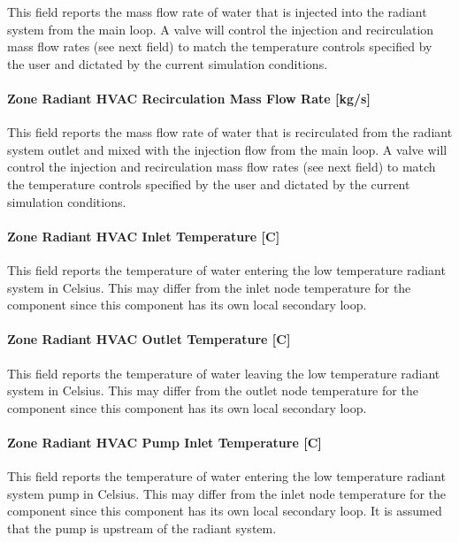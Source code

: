 This field reports the mass flow rate of water that is injected into the radiant system from the main loop. A valve will control the injection and recirculation mass flow rates (see next field) to match the temperature controls specified by the user and dictated by the current simulation conditions.

\paragraph{Zone Radiant HVAC Recirculation Mass Flow Rate {[}kg/s{]}}\label{zone-radiant-hvac-recirculation-mass-flow-rate-kgs}

This field reports the mass flow rate of water that is recirculated from the radiant system outlet and mixed with the injection flow from the main loop. A valve will control the injection and recirculation mass flow rates (see next field) to match the temperature controls specified by the user and dictated by the current simulation conditions.

\paragraph{Zone Radiant HVAC Inlet Temperature {[}C{]}}\label{zone-radiant-hvac-inlet-temperature-c-1}

This field reports the temperature of water entering the low temperature radiant system in Celsius. This may differ from the inlet node temperature for the component since this component has its own local secondary loop.

\paragraph{Zone Radiant HVAC Outlet Temperature {[}C{]}}\label{zone-radiant-hvac-outlet-temperature-c-1}

This field reports the temperature of water leaving the low temperature radiant system in Celsius. This may differ from the outlet node temperature for the component since this component has its own local secondary loop.

\paragraph{Zone Radiant HVAC Pump Inlet Temperature {[}C{]}}\label{zone-radiant-hvac-pump-inlet-temperature-c}

This field reports the temperature of water entering the low temperature radiant system pump in Celsius. This may differ from the inlet node temperature for the component since this component has its own local secondary loop. It is assumed that the pump is upstream of the radiant system.

